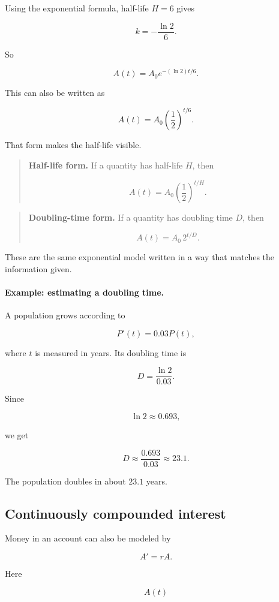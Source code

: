 Using the exponential formula, half-life \(H=6\) gives

\[
k=-\frac{\ln2}{6}.
\]

So

\[
A(t)=A_0e^{-(\ln2)t/6}.
\]

This can also be written as

\[
A(t)=A_0\left(\frac12\right)^{t/6}.
\]

That form makes the half-life visible.

\begin{quote}
\textbf{Half-life form.}
If a quantity has half-life \(H\), then

\[
\boxed{
A(t)=A_0\left(\frac12\right)^{t/H}.
}
\]
\end{quote}

\begin{quote}
\textbf{Doubling-time form.}
If a quantity has doubling time \(D\), then

\[
\boxed{
A(t)=A_0\,2^{t/D}.
}
\]
\end{quote}

These are the same exponential model written in a way that matches the information
given.

\paragraph{Example: estimating a doubling time.}
A population grows according to

\[
P'(t)=0.03P(t),
\]

where \(t\) is measured in years.  Its doubling time is

\[
D=\frac{\ln2}{0.03}.
\]

Since

\[
\ln2\approx0.693,
\]

we get

\[
D\approx\frac{0.693}{0.03}\approx23.1.
\]

The population doubles in about \(23.1\) years.

\subsection{Continuously compounded interest}
\label{subsec:continuously-compounded-interest}

Money in an account can also be modeled by

\[
A'=rA.
\]

Here

\[
A(t)
\]

